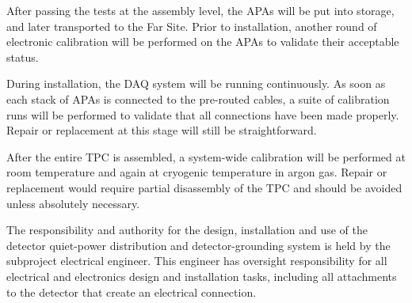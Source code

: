 After passing the tests at the assembly level, the APAs will be put into storage, and later transported to the Far Site. Prior to installation, another round of electronic calibration will be performed on the APAs to validate their acceptable status. 

During installation, the DAQ system will be running continuously. As soon as each stack of APAs is connected to the pre-routed cables, a suite of calibration runs will be performed to validate that all connections have been made properly. Repair or replacement at this stage will still be straightforward. 

After the entire TPC is assembled, a system-wide calibration will be performed at room temperature and again at cryogenic temperature in argon gas. Repair or replacement would require partial disassembly of the TPC and should be avoided unless absolutely necessary. 

The responsibility and authority for the design, installation and use of the detector quiet-power distribution and detector-grounding system is held by the subproject electrical engineer. This engineer has oversight responsibility for all electrical and electronics design and installation tasks, including all attachments to the detector that create an electrical connection. 



